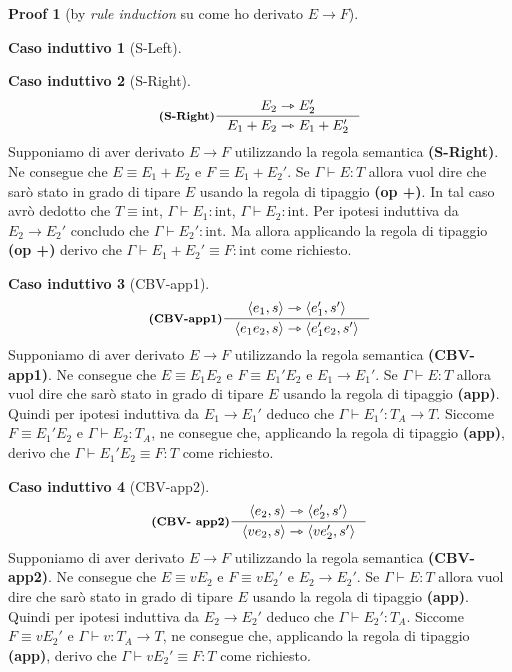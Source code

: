 \documentclass[a4paper, 10pt]{article}
\theoremstyle{definition}
\newtheorem{prf}{Proof}[]
\newtheorem{ind}{Caso induttivo}
\newcommand{\infer}[4]{\inference[\textbf{#1}]{#2}{#3}#4 }
\newcommand{\srule}[2]{\langle #1 \rangle \rightarrowtriangle \langle #2 \rangle}
\newcommand{\goesto}{\rightarrowtriangle}
\begin{document}
\begin{multicols}{2}
\begin{prf}[by \textit{rule induction} su come ho derivato $ E\rightarrow F$]
\begin{ind}[S-Left]
	\end{ind}
	\columnbreak
	\begin{ind}[S-Right]
		\[
			\infer{(S-Right)}{E_2 \goesto E_2'}{E_1 + E_2 \goesto E_1 + E_2'}{}
		\]
		Supponiamo di aver derivato $ E\rightarrow F $ utilizzando la regola semantica \textbf{(S-Right)}. Ne consegue che $ E\equiv E_1 + E_2 $ e $ F\equiv E_1 + E_2' $. Se $ \Gamma\vdash E\colon T $ allora vuol dire che sarò stato in grado di tipare $ E $ usando la regola di tipaggio \textbf{(op +)}. In tal caso avrò dedotto che $ T\equiv \text{int} $, $ \Gamma\vdash E_1\colon \text{int} $, $ \Gamma\vdash E_2\colon \text{int} $. Per ipotesi induttiva da $ E_2\rightarrow E_2' $ concludo che $ \Gamma\vdash E_2'\colon \text{int} $. Ma allora applicando la regola di tipaggio \textbf{(op +)} derivo che $ \Gamma\vdash E_1 + E_2'\equiv F \colon \text{int} $ come richiesto.
	\end{ind}
	\begin{ind}[CBV-app1]
		\[
			\infer{(CBV-app1)}{\srule{e_1, s}{e_1', s'}}{\srule{e_1 e_2, s}{e_1'e_2, s'}}{}
		\]
		Supponiamo di aver derivato $ E\rightarrow F $ utilizzando la regola semantica \textbf{(CBV-app1)}. Ne consegue che $ E\equiv E_1E_2 $ e $ F\equiv E_1'E_2 $ e $ E_1\rightarrow E_1' $. Se $ \Gamma\vdash E\colon T $ allora vuol dire che sarò stato in grado di tipare $ E $ usando la regola di tipaggio \textbf{(app)}. Quindi per ipotesi induttiva da $ E_1\rightarrow E_1' $ deduco che $ \Gamma\vdash E_1'\colon T_A\rightarrow T $. Siccome $ F\equiv E_1'E_2 $ e $ \Gamma \vdash E_2 \colon T_A $, ne consegue che, applicando la regola di tipaggio \textbf{(app)}, derivo che $ \Gamma\vdash E_1'E_2\equiv F \colon T $ come richiesto.
	\end{ind}
	\begin{ind}[CBV-app2]
		\[
			\infer{(CBV- app2)}{\srule{e_2, s}{e_2', s'}}{\srule{ve_2, s}{ve_2', s'}}{}
		\]
		Supponiamo di aver derivato $ E\rightarrow F $ utilizzando la regola semantica \textbf{(CBV-app2)}. Ne consegue che $ E\equiv vE_2 $ e $ F\equiv vE_2' $ e $ E_2\rightarrow E_2' $. Se $ \Gamma\vdash E\colon T $ allora vuol dire che sarò stato in grado di tipare $ E $ usando la regola di tipaggio \textbf{(app)}. Quindi per ipotesi induttiva da $ E_2\rightarrow E_2' $ deduco che $ \Gamma\vdash E_2'\colon T_A $. Siccome $ F\equiv vE_2' $ e $ \Gamma \vdash v \colon T_A\rightarrow T $, ne consegue che, applicando la regola di tipaggio \textbf{(app)}, derivo che $ \Gamma\vdash vE_2'\equiv F \colon T $ come richiesto.
	\end{ind}
\end{prf}
\end{multicols}
\end{document}
